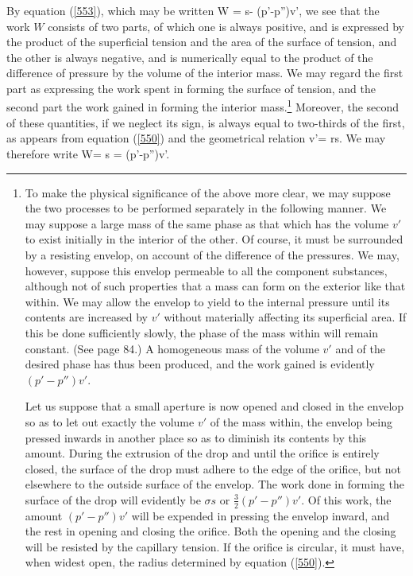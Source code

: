 \documentclass[12pt]{article}
\begin{document}
{By equation (\ref{553}), which may be written
\eqs W = \sigma s- (p'-p'')v', \label{559}\eqe
we see that the work $W$ consists of two parts, of which one is always positive, and is expressed by the product of the superficial tension and the area of the surface of tension, and the other is always negative, and is numerically equal to the product of the difference of pressure by the volume of the interior mass. We may regard the first part as expressing the work spent in forming the surface of tension, and the second part the work gained in forming the interior mass.\footnote{To make the physical significance of the above more clear, we may suppose the two processes to be performed separately in the following manner. We may suppose a large mass of the same phase as that which has the volume $v'$ to exist initially in the interior of the other. Of course, it must be surrounded by a resisting envelop, on account of the difference of the pressures. We may, however, suppose this envelop permeable to all the component substances, although not of such properties that a mass can form on the exterior like that within. We may allow the envelop to yield to the internal pressure until its contents are increased by $v'$ without materially affecting its superficial area. If this be done sufficiently slowly, the phase of the mass within will remain constant. (See page 84.) A homogeneous mass of the volume $v'$ and of the desired phase has thus been produced, and the work gained is evidently $(p' -p'')v'$. \par
Let us suppose that a small aperture is now opened and closed in the envelop so as to let out exactly the volume $v'$ of the mass within, the envelop being pressed inwards in another place so as to diminish its contents by this amount. During the extrusion of the drop and until the orifice is entirely closed, the surface of the drop must adhere to the edge of the orifice, but not elsewhere to the outside surface of the envelop. The work done in forming the surface of the drop will evidently be $\sigma s$ or $\frac{3}{2}(p'-p'')v'$. Of this work, the amount $(p'-p'')v'$ will be expended in pressing the envelop inward, and the rest in opening and closing the orifice. Both the opening and the closing will be resisted by the capillary tension. If the orifice is circular, it must have, when widest open, the radius determined by equation (\ref{550}).} Moreover, the second of these quantities, if we neglect its sign, is always equal to two-thirds of the first, as appears from equation (\ref{550}) and the geometrical relation v'= rs. We may therefore write
\eqs  W= \sigma s = (p'-p'')v'. \label{560}\eqe
}
\end{document}
